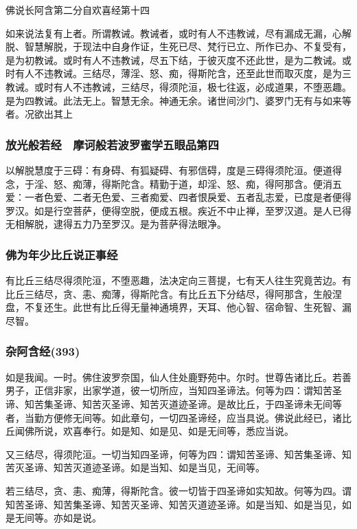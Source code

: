 \documentclass{book}
\begin{document}
佛说长阿含第二分自欢喜经第十四

如来说法复有上者。所谓教诫。教诫者，或时有人不违教诫，尽有漏成无漏，心解脱、智慧解脱，于现法中自身作证，生死已尽、梵行已立、所作已办、不复受有，是为初教诫。或时有人不违教诫，尽五下结，于彼灭度不还此世，是为二教诫。或时有人不违教诫。三结尽，薄淫、怒、痴，得斯陀含，还至此世而取灭度，是为三教诫。或时有人不违教诫，三结尽，得须陀洹，极七往返，必成道果，不堕恶趣。是为四教诫。此法无上。智慧无余。神通无余。诸世间沙门、婆罗门无有与如来等者。况欲出其上

\subsubsection{放光般若经　摩诃般若波罗蜜学五眼品第四}

以解脱慧度于三碍：有身碍、有狐疑碍、有邪信碍，度是三碍得须陀洹。便道得念，于淫、怒、痴薄，得斯陀含。精勤于道，却淫、怒、痴，得阿那含。便消五爱：一者色爱、二者无色爱、三者痴爱、四者恨戾爱、五者乱志爱，已度是者便得罗汉。如是行空菩萨，便得空脱，便成五根。疾近不中止禅，至罗汉道。是人已得无相解脱，逮得五力乃至罗汉。是为菩萨得法眼净。

\subsubsection{佛为年少比丘说正事经}

有比丘三结尽得须陀洹，不堕恶趣，法决定向三菩提，七有天人往生究竟苦边。有比丘三结尽，贪、恚、痴薄，得斯陀含。有比丘五下分结尽，得阿那含，生般涅盘，不复还生。此世有比丘得无量神通境界，天耳、他心智、宿命智、生死智、漏尽智。

\subsubsection{杂阿含经(393)}

如是我闻。一时。佛住波罗奈国，仙人住处鹿野苑中。尔时。世尊告诸比丘。若善男子，正信非家，出家学道，彼一切所应，当知四圣谛法。何等为四：谓知苦圣谛、知苦集圣谛、知苦灭圣谛、知苦灭道迹圣谛。是故比丘，于四圣谛未无间等者，当勤方便修无间等。如此章句，一切四圣谛经，应当具说。佛说此经已，诸比丘闻佛所说，欢喜奉行。如是知、如是见、如是无间等，悉应当说。

又三结尽，得须陀洹。一切当知四圣谛，何等为四：谓知苦圣谛、知苦集圣谛、知苦灭圣谛、知苦灭道迹圣谛。如是当知、如是当见，无间等。

若三结尽，贪、恚、痴薄，得斯陀含。彼一切皆于四圣谛如实知故。何等为四。谓知苦圣谛、知苦集圣谛、知苦灭圣谛、知苦灭道迹圣谛。如是当知、如是当见，如是无间等。亦如是说。
\end{document}
